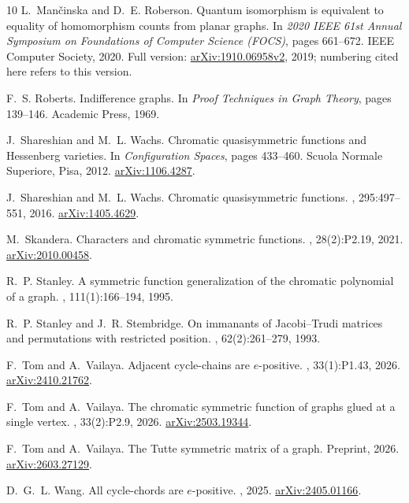 \documentclass[12pt]{article}
\theoremstyle{plain}
\theoremstyle{definition}
\theoremstyle{remark}
\begin{document}
\begin{thebibliography}{10}
L.~Man\v{c}inska and D.~E. Roberson.
\newblock Quantum isomorphism is equivalent to equality of homomorphism counts from planar graphs.
\newblock In {\em 2020 IEEE 61st Annual Symposium on Foundations of Computer Science (FOCS)}, pages 661--672. IEEE Computer Society, 2020.
\newblock Full version: \href{https://arxiv.org/abs/1910.06958v2}{arXiv:1910.06958v2}, 2019; numbering cited here refers to this version.

F.~S. Roberts.
\newblock Indifference graphs.
\newblock In {\em Proof Techniques in Graph Theory}, pages 139--146. Academic Press, 1969.

J.~Shareshian and M.~L. Wachs.
\newblock Chromatic quasisymmetric functions and {H}essenberg varieties.
\newblock In {\em Configuration Spaces}, pages 433--460. Scuola Normale Superiore, Pisa, 2012.
\newblock \href{https://arxiv.org/abs/1106.4287}{arXiv:1106.4287}.

J.~Shareshian and M.~L. Wachs.
\newblock Chromatic quasisymmetric functions.
, 295:497--551, 2016.
\newblock \href{https://arxiv.org/abs/1405.4629}{arXiv:1405.4629}.

M.~Skandera.
\newblock Characters and chromatic symmetric functions.
, 28(2):P2.19, 2021.
\newblock \href{https://arxiv.org/abs/2010.00458}{arXiv:2010.00458}.

R.~P. Stanley.
\newblock A symmetric function generalization of the chromatic polynomial of a graph.
, 111(1):166--194, 1995.

R.~P. Stanley and J.~R. Stembridge.
\newblock On immanants of {J}acobi--{T}rudi matrices and permutations with restricted position.
, 62(2):261--279, 1993.

F.~Tom and A.~Vailaya.
\newblock Adjacent cycle-chains are $e$-positive.
, 33(1):P1.43, 2026.
\newblock \href{https://arxiv.org/abs/2410.21762}{arXiv:2410.21762}.

F.~Tom and A.~Vailaya.
\newblock The chromatic symmetric function of graphs glued at a single vertex.
, 33(2):P2.9, 2026.
\newblock \href{https://arxiv.org/abs/2503.19344}{arXiv:2503.19344}.

F.~Tom and A.~Vailaya.
\newblock The {Tutte} symmetric matrix of a graph.
\newblock Preprint, 2026.
\newblock \href{https://arxiv.org/abs/2603.27129}{arXiv:2603.27129}.

D.~G.~L. Wang.
\newblock All cycle-chords are $e$-positive.
, 2025.
\newblock \href{https://arxiv.org/abs/2405.01166}{arXiv:2405.01166}.

\end{thebibliography}
\end{document}
